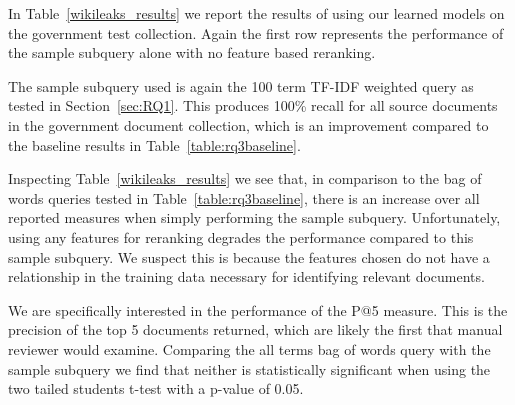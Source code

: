 \documentclass{mpaper}
\begin{document}
In Table~\ref{wikileaks_results} we report the results of using our learned models on the government test collection. Again the first row represents the performance of the sample subquery alone with no feature based reranking. 

The sample subquery used is again the 100 term TF-IDF weighted query as tested in Section~\ref{sec:RQ1}. This produces 100\% recall for all source documents in the government document collection, which is an improvement compared to the baseline results in Table~\ref{table:rq3baseline}.

\begin{center}
\begin{table}[H]
\centering
{}
\caption{Learning to Rank with Various Feature Combinations on Real Government Documents Collection}
\label{wikileaks_results}
\end{table}
\end{center}

Inspecting Table~\ref{wikileaks_results} we see that, in comparison to the bag of words queries tested in Table~\ref{table:rq3baseline}, there is an increase over all reported measures when simply performing the sample subquery. Unfortunately, using any features for reranking degrades the performance compared to this sample subquery. We suspect this is because the features chosen do not have a relationship in the training data necessary for identifying relevant documents.

We are specifically interested in the performance of the P@5 measure. This is the precision of the top 5 documents returned, which are likely the first that manual reviewer would examine.
Comparing the all terms bag of words query with the sample subquery we find that neither is statistically significant when using the two tailed students t-test with a p-value of 0.05.
\end{document}
